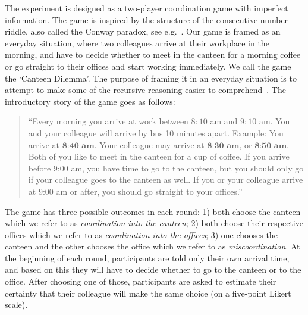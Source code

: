 The experiment is designed as a two-player coordination game with imperfect information. The game is inspired by the structure of the consecutive number riddle, also called the Conway paradox, see e.g.\ \cite{van1980conway,van2015one}. Our game is framed as an everyday situation, where two colleagues arrive at their workplace in the morning, and have to decide whether to meet in the canteen for a morning coffee or go straight to their offices and start working immediately. We call the game the `Canteen Dilemma'. The purpose of framing it in an everyday situation is to attempt to make some of the recursive reasoning easier to comprehend~\cite{meijering2010facilitative, wason1971natural}. The introductory story of the game goes as follows: 
\begin{quote}
\indent
``Every morning you arrive at work between $8{:}10$ am and $9{:}10$ am. You and your colleague will arrive by bus 10 minutes apart. Example: You arrive at $\textbf{8:40 am}$. Your colleague may arrive at $\textbf{8:30  am}$, or $\textbf{8:50 am}$. Both of you like to meet in the canteen for a cup of coffee. If you arrive before 9:00 am, you have time to go to the canteen, but you should only go if your colleague goes to the canteen as well. If you or your colleague arrive at 9:00 am or after, you should go straight to your offices.''
\end{quote}




The game has three possible outcomes in each round: 1) both choose the canteen which we refer to as \emph{coordination into the canteen}; 2) both choose their respective offices which we refer to as \emph{coordination into the offices}; 3) one chooses the canteen and the other chooses the office which we refer to as \emph{miscoordination}. At the beginning of each round, participants are told only their own arrival time, and based on this they will have to decide whether to go to the canteen or to the office. After choosing one of those, participants are asked to estimate their certainty that their colleague will make the same choice (on a five-point Likert scale). 

